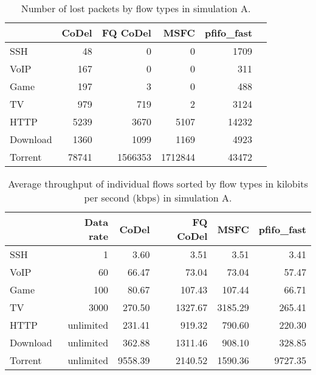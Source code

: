 \begin{table}
	\caption{Number of lost packets by flow types in simulation A.}
	\label{tab:loss_A}
	\centering
	
	\begin{tabular}{@{}l|rrrrr@{}}
		\toprule
		& {CoDel} & {FQ CoDel} & {MSFC} & {pfifo\_fast}  \\ \midrule
		SSH       &    48         &    0          &    0          &    1709  \\
		VoIP      &    167        &    0          &    0          &    311   \\
		Game      &    197        &    3          &    0          &    488   \\
		TV        &    979        &    719        &    2          &    3124  \\
		HTTP      &    5239       &    3670       &    5107       &    14232 \\
		Download  &    1360       &    1099       &    1169       &    4923  \\
		Torrent   &    78741      &    1566353    &    1712844    &    43472 \\ \bottomrule
	\end{tabular}
\end{table}

\begin{table}
	\caption{Average throughput of individual flows sorted by flow types in kilobits per second (kbps)  in simulation A.}
	\label{tab:throughput_A}
	\centering
	
	\begin{tabular}{@{}l|rrrrr@{}}
		\toprule
		         & {Data rate} & {CoDel} & {FQ CoDel} &  {MSFC} & {pfifo\_fast} \\ \midrule
		SSH      &           1 &    3.60 &       3.51 &    3.51 &          3.41 \\
		VoIP     &          60 &   66.47 &      73.04 &   73.04 &         57.47 \\
		Game     &         100 &   80.67 &     107.43 &  107.44 &         66.71 \\
		TV       &        3000 &  270.50 &    1327.67 & 3185.29 &        265.41 \\
		HTTP     &   unlimited &  231.41 &     919.32 &  790.60 &        220.30 \\
		Download &   unlimited &  362.88 &    1311.46 &  908.10 &        328.85 \\
		Torrent  &   unlimited & 9558.39 &    2140.52 & 1590.36 &       9727.35 \\ \bottomrule
	\end{tabular}
\end{table}









